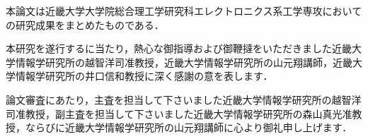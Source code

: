 本論文は近畿大学大学院総合理工学研究科エレクトロニクス系工学専攻においての研究成果をまとめたものである．

本研究を遂行するに当たり，熱心な御指導および御鞭撻をいただきました近畿大学情報学研究所の越智洋司准教授，近畿大学情報学研究所の山元翔講師，近畿大学情報学研究所の井口信和教授に深く感謝の意を表します．

論文審査にあたり，主査を担当して下さいました近畿大学情報学研究所の越智洋司准教授，副主査を担当して下さいました近畿大学情報学研究所の森山真光准教授，ならびに近畿大学情報学研究所の山元翔講師に心より御礼申し上げます．